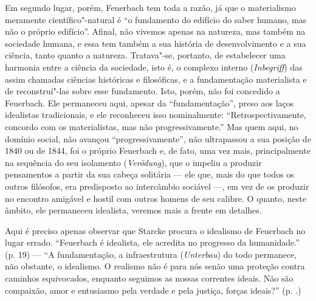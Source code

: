 Em segundo lugar,
porém, Feuerbach tem
toda a razão, já que o materialismo meramente científico"-natural é ``o
fundamento do edifício do saber humano, mas não o próprio edifício''.
Afinal, não vivemos apenas na natureza, mas também na sociedade humana,
e essa tem também a sua história de desenvolvimento e a sua ciência,
tanto quanto a natureza. Tratava"-se, portanto, de estabelecer uma
harmonia entre a ciência da sociedade, isto é, o complexo interno
(\emph{Inbegriff}) das assim chamadas ciências históricas e filosóficas,
e a fundamentação materialista e de reconstruí"-las sobre esse
fundamento. Isto, porém, não foi concedido
a Feuerbach.
Ele permaneceu aqui, apesar da ``fundamentação'', preso aos laços
idealistas tradicionais, e ele reconheceu isso nominalmente:
``Retrospectivamente, concordo com os materialistas, mas não
progressivamente.'' Mas quem aqui, no domínio social, não avançou
``progressivamente'', não ultrapassou a sua posição de 1840 ou de 1844,
foi o
próprio Feuerbach e,
de fato, uma vez mais, principalmente na sequência do seu isolamento
(\emph{Verödung}), que o impeliu a produzir pensamentos a partir da sua
cabeça solitária --- ele que, mais do que todos os outros filósofos, era
predisposto ao intercâmbio sociável ---, em vez de os produzir no encontro
amigável e hostil com outros homens de seu calibre. O quanto, neste
âmbito, ele permaneceu idealista, veremos mais a frente em detalhes.

Aqui é preciso apenas observar que Starcke procura o idealismo
de Feuerbach no
lugar errado.
``Feuerbach é
idealista, ele acredita no progresso da humanidade.'' (p. 19) --- ``A
fundamentação, a infraestrutura (\emph{Unterbau}) do todo permanece,
não obstante, o idealismo. O realismo não é para nós senão uma proteção
contra caminhos equivocados, enquanto seguimos as nossas correntes
ideais. Não são compaixão, amor e entusiasmo pela verdade e pela
justiça, forças ideais?'' (p. .)

